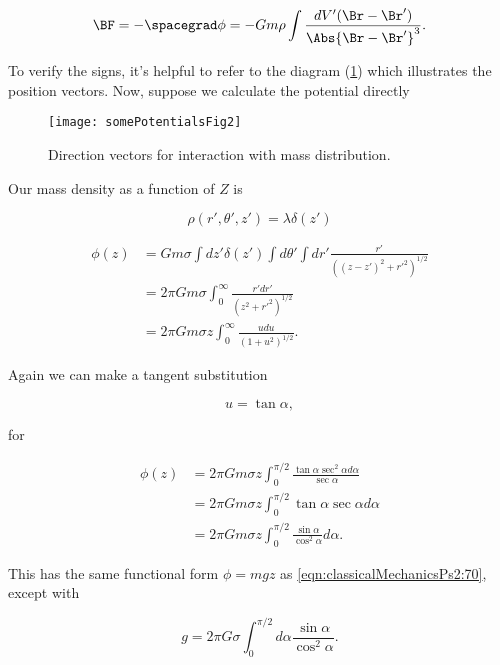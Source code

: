 \begin{equation}\label{eqn:classicalMechanicsPs2:130}
\BF = - \spacegrad \phi = - G m \rho \int \frac{dV' (\Br - \Br')}{\Abs{\Br - \Br'}^3}.
\end{equation}

To verify the signs, it's helpful to refer to the diagram (\ref{fig:classicalMechanicsPs2:somePotentialsFig2}) which illustrates the position vectors.  Now, suppose we calculate the potential directly
\begin{figure}[htp]
   \centering
   \texttt{[image: somePotentialsFig2]}
   \caption{Direction vectors for interaction with mass distribution.}\label{fig:classicalMechanicsPs2:somePotentialsFig2}
\end{figure}

Our mass density as a function of $Z$ is

\begin{equation}\label{eqn:classicalMechanicsPs2:n}
\rho(r', \theta', z') = \lambda \delta(z')
\end{equation}

\begin{align*}
\phi(z)
&= G m \sigma \int dz' \delta(z') \int d\theta' \int dr' \frac{r' }{((z-z')^2 + {r'}^2)^{1/2}} \\
&= 2 \pi G m \sigma \int_0^\infty \frac{r' dr' }{(z^2 + {r'}^2)^{1/2}} \\
&= 2 \pi G m \sigma z \int_0^\infty \frac{u du }{(1 + u^2)^{1/2}}.
\end{align*}

Again we can make a tangent substitution

\begin{equation}\label{eqn:classicalMechanicsPs2:150}
u = \tan\alpha,
\end{equation}

for

\begin{align*}
\phi(z)
&= 2 \pi G m \sigma z \int_0^{\pi/2} \frac{\tan \alpha \sec^2 \alpha d \alpha }{\sec\alpha} \\
&= 2 \pi G m \sigma z \int_0^{\pi/2} \tan \alpha \sec \alpha d \alpha \\
&= 2 \pi G m \sigma z \int_0^{\pi/2} \frac{\sin \alpha}{\cos^2 \alpha} d \alpha.
\end{align*}

This has the same functional form $\phi = m g z$ as \ref{eqn:classicalMechanicsPs2:70}, except with

\begin{equation}\label{eqn:classicalMechanicsPs2:n}
g = 2 \pi G \sigma \int_0^{\pi/2} d\alpha \frac{\sin \alpha}{\cos^2 \alpha}.
\end{equation}

